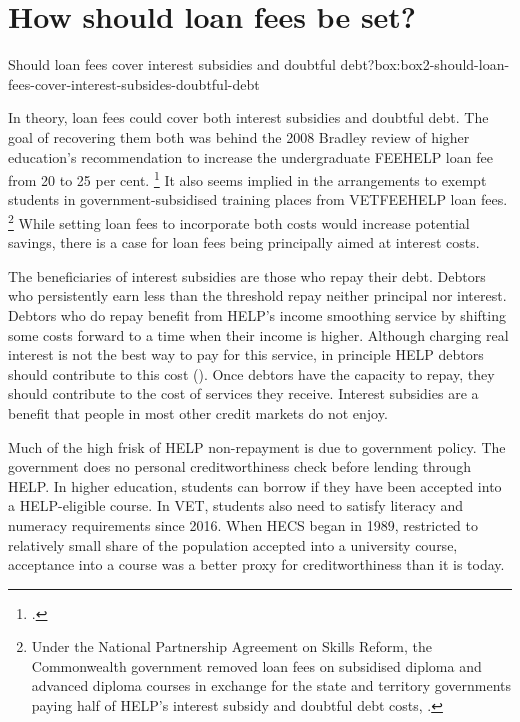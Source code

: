 \documentclass[embargoed]{grattan}
\begin{document}
\section{How should loan fees be set?}\label{how-should-loan-fees-be-set}


\begin{bigbox*}{Should loan fees cover interest subsidies and doubtful debt?}{box:box2-should-loan-fees-cover-interest-subsides-doubtful-debt}

In theory, loan fees could cover both interest subsidies and doubtful debt.
The goal of recovering them both was behind the 2008 Bradley review of higher education's recommendation to increase the undergraduate \gls{FEEHELP} loan fee from 20 to 25 per cent.%
\footcite[][167--168]{Bradley2008ReviewAustralianhigher}
It also seems implied in the arrangements to exempt students in government-subsidised training places from \gls{VETFEEHELP} loan fees.%
\footnote{Under the National Partnership Agreement on Skills Reform, the Commonwealth government removed loan fees on subsidised diploma and advanced diploma courses in exchange for the state and territory governments paying half of \gls{HELP}'s interest subsidy and doubtful debt costs, \textcite[][25]{AustralianGovernments2012NationalPartnershipAgreement}.} While setting loan fees to incorporate both costs would increase potential savings, there is a case for loan fees being principally aimed at interest costs.

The beneficiaries of interest subsidies are those who repay their debt.
Debtors who persistently earn less than the threshold repay neither principal nor interest.
Debtors who do repay benefit from \gls{HELP}'s income smoothing service by shifting some costs forward to a time when their income is higher.
Although charging real interest is not the best way to pay for this service, in principle \gls{HELP} debtors should contribute to this cost ().
Once debtors have the capacity to repay, they should contribute to the cost of services they receive.
Interest subsidies are a benefit that people in most other credit markets do not enjoy.

Much of the high frisk of \gls{HELP} non-repayment is due to government policy.
The government does no personal creditworthiness check before lending through \gls{HELP}.
In higher education, students can borrow if they have been accepted into a \gls{HELP}-eligible course.
In VET, students also need to satisfy literacy and numeracy requirements since 2016.
When \gls{HECS} began in 1989, restricted to relatively small share of the population accepted into a university course, acceptance into a course was a better proxy for creditworthiness than it is today.


\end{bigbox*}
\end{document}
